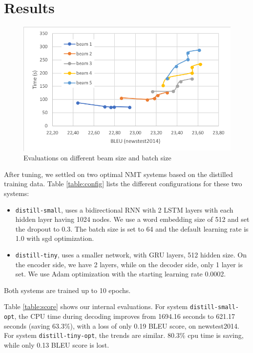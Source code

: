 \documentclass[11pt,a4paper]{article}
\begin{document}
\section{Results}

\begin{figure}
\includegraphics[width=\linewidth]{beambatch.png}
\caption{\small Evaluations on different beam size and batch size}
\label{fig:beam_batch_bleu}
\end{figure}

After tuning, we settled on two optimal NMT systems based on the
distilled training data. Table \ref{table:config}
lists the different configurations for these two systems:

\begin{itemize}
\item {\tt distill-small}, uses a bidirectional RNN with 2 LSTM layers with each hidden layer having 1024 nodes.
We use a word embedding size of 512 and set the dropout to 0.3.
The batch size is set to 64 and the default learning rate is 1.0 with sgd optimization.
\item {\tt distill-tiny}, uses  a smaller network, with GRU layers, 512 hidden size.
On the encoder side, we have 2 layers, while on the decoder side, only 1 layer is set.
We use Adam optimization with the starting learning rate 0.0002.
\end{itemize}
Both systems are trained up to 10 epochs.

Table \ref{table:score} shows our internal evaluations.
For system {\tt distill-small-opt}, the CPU time during decoding improves from 1694.16 seconds to 621.17 seconds (saving 63.3\%), with a loss of only 0.19 BLEU score, on newstest2014.
For system {\tt distill-tiny-opt}, the trends are similar.
80.3\% cpu time is saving, while only 0.13 BLEU score is lost.
\end{document}
